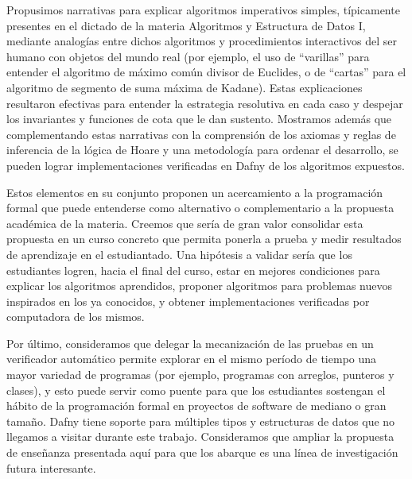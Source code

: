 \documentclass[12pt, a4paper, openany, fleqn]{book}
\begin{document}
    Propusimos narrativas para explicar algoritmos imperativos simples, típicamente presentes en el dictado de la materia Algoritmos y Estructura de Datos I, mediante analogías entre dichos algoritmos y procedimientos interactivos del ser humano con objetos del mundo real (por ejemplo, el uso de ``varillas'' para entender el algoritmo de máximo común divisor de Euclides, o de ``cartas'' para el algoritmo de segmento de suma máxima de Kadane). Estas explicaciones resultaron efectivas para entender la estrategia resolutiva en cada caso y despejar los invariantes y funciones de cota que le dan sustento. Mostramos además que complementando estas narrativas con la comprensión de los axiomas y reglas de inferencia de la lógica de Hoare y una metodología para ordenar el desarrollo, se pueden lograr implementaciones verificadas en Dafny de los algoritmos expuestos.

    Estos elementos en su conjunto proponen un acercamiento a la programación formal que puede entenderse como alternativo o complementario a la propuesta académica de la materia. Creemos que sería de gran valor consolidar esta propuesta en un curso concreto que permita ponerla a prueba y medir resultados de aprendizaje en el estudiantado. Una hipótesis a validar sería que los estudiantes logren, hacia el final del curso, estar en mejores condiciones para explicar los algoritmos aprendidos, proponer algoritmos para problemas nuevos inspirados en los ya conocidos, y obtener implementaciones verificadas por computadora de los mismos.

    Por último, consideramos que delegar la mecanización de las pruebas en un verificador automático permite explorar en el mismo período de tiempo una mayor variedad de programas (por ejemplo, programas con arreglos, punteros y clases), y esto puede servir como puente para que los estudiantes sostengan el hábito de la programación formal en proyectos de software de mediano o gran tamaño. Dafny tiene soporte para múltiples tipos y estructuras de datos que no llegamos a visitar durante este trabajo. Consideramos que ampliar la propuesta de enseñanza presentada aquí para que los abarque es una línea de investigación futura interesante.

    
    
\end{document}
